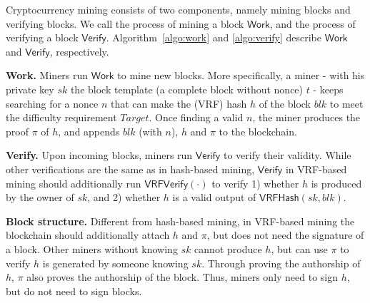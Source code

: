Cryptocurrency mining consists of two components, namely mining blocks and verifying blocks.
We call the process of mining a block $\mathsf{Work}$, and the process of verifying a block $\mathsf{Verify}$.
Algorithm~\ref{algo:work} and \ref{algo:verify} describe $\mathsf{Work}$ and $\mathsf{Verify}$, respectively.

\textbf{Work.}
Miners run $\mathsf{Work}$ to mine new blocks.
More specifically, a miner - with his private key $sk$ the block template (a complete block without nonce) $t$ - keeps searching for a nonce $n$ that can make the (VRF) hash $h$ of the block $blk$ to meet the difficulty requirement $Target$.
Once finding a valid $n$, the miner produces the proof $\pi$ of $h$, and appends $blk$ (with $n$), $h$ and $\pi$ to the blockchain.

\textbf{Verify.}
Upon incoming blocks, miners run $\mathsf{Verify}$ to verify their validity.
While other verifications are the same as in hash-based mining, $\mathsf{Verify}$ in VRF-based mining should additionally run $\mathsf{VRFVerify}(\cdot)$ to verify 1) whether $h$ is produced by the owner of $sk$, and 2) whether $h$ is a valid output of $\mathsf{VRFHash}(sk, blk)$.

\textbf{Block structure.}
Different from hash-based mining, in VRF-based mining the blockchain should additionally attach $h$ and $\pi$, but does not need the signature of a block.
Other miners without knowing $sk$ cannot produce $h$, but can use $\pi$ to verify $h$ is generated by someone knowing $sk$.
Through proving the authorship of $h$, $\pi$ also proves the authorship of the block.
Thus, miners only need to sign $h$, but do not need to sign blocks.